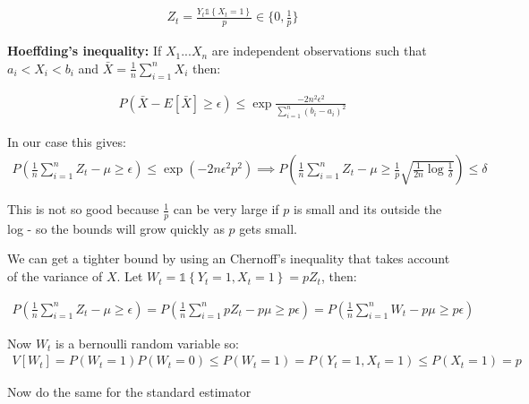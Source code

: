 \documentclass{article}
\newcommand{\set}[1]{\left\{#1\right\}}
\newcommand{\ind}[1]{\mathds{1}\!\!\set{#1}}
\newcommand{\eqn}[1]{\begin{align}#1\end{align}}
\theoremstyle{plain}
\theoremstyle{definition}
\begin{document}
\eqn{
Z_t = \frac{Y_t \ind{X_t=1}}{p} \in \{0,\frac{1}{p}\}
}

\textbf{Hoeffding's inequality:} If $X_1...X_n$ are independent observations such that $a_i < X_i < b_i$ and $\bar{X} = \frac{1}{n}\sum_{i=1}^n X_i$ then:

\eqn {
P(\bar{X} - E[\bar{X}] \geq \epsilon) \leq \exp{\frac{-2n^2\epsilon^2}{\sum_{i=1}^n(b_i - a_i)^2}}
}

In our case this gives:
\eqn{
P(\frac{1}{n}\sum_{i=1}^n Z_t - \mu \geq \epsilon) \leq \exp{(-2n\epsilon^2p^2)} 
\implies P(\frac{1}{n}\sum_{i=1}^n Z_t - \mu \geq \frac{1}{p}\sqrt{\frac{1}{2n}\log{\frac{1}{\delta}}}) \leq \delta
}

This is not so good because $\frac{1}{p}$ can be very large if $p$ is small and its outside the log - so the bounds will grow quickly as $p$ gets small. 

We can get a tighter bound by using an Chernoff's inequality that takes account of the variance of $X$. Let $W_t = \ind{Y_t = 1,X_t=1} = pZ_t$, then:

\eqn{
P(\frac{1}{n}\sum_{i=1}^n Z_t - \mu \geq \epsilon) = P(\frac{1}{n}\sum_{i=1}^n pZ_t - p\mu \geq p\epsilon) = P(\frac{1}{n}\sum_{i=1}^n W_t - p\mu \geq p\epsilon)
}

Now $W_t$ is a bernoulli random variable so:
\eqn{
V[W_t] = P(W_t=1)P(W_t=0) \leq P(W_t=1) = P(Y_t=1,X_t=1) \leq P(X_t=1) = p
}



\color{red} Now do the same for the standard estimator \color{black}








\end{document}
